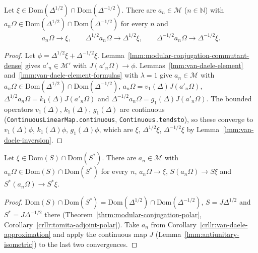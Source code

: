 \begin{corollary}
    \label{crllr:van-daele-approximation}
    \leanok
    Let $\xi \in \text{Dom}(\Delta^{1/2}) \cap \text{Dom}(\Delta^{-1/2})$. There are $a_n \in \mathcal{M}$ ($n \in \mathbb{N}$) with $a_n\Omega \in \text{Dom}(\Delta^{1/2}) \cap \text{Dom}(\Delta^{-1/2})$ for every $n$ and
    \begin{align}
        a_n\Omega \to \xi, \qquad \Delta^{1/2}a_n\Omega \to \Delta^{1/2}\xi, \qquad \Delta^{-1/2}a_n\Omega \to \Delta^{-1/2}\xi.
    \end{align}
\end{corollary}
\begin{proof}
    \leanok
    Let $\phi = \Delta^{1/2}\xi + \Delta^{-1/2}\xi$. Lemma~\ref{lmm:modular-conjugation-commutant-dense} gives $a'_n \in \mathcal{M}'$ with $J(a'_n\Omega) \to \phi$. Lemmas~\ref{lmm:van-daele-element} and~\ref{lmm:van-daele-element-formulas} with $\lambda = 1$ give $a_n \in \mathcal{M}$ with $a_n\Omega \in \text{Dom}(\Delta^{1/2}) \cap \text{Dom}(\Delta^{-1/2})$, $a_n\Omega = v_1(\Delta)J(a'_n\Omega)$, $\Delta^{1/2}a_n\Omega = k_1(\Delta)J(a'_n\Omega)$ and $\Delta^{-1/2}a_n\Omega = g_1(\Delta)J(a'_n\Omega)$. The bounded operators $v_1(\Delta)$, $k_1(\Delta)$, $g_1(\Delta)$ are continuous (\texttt{ContinuousLinearMap.continuous}, \texttt{Continuous.tendsto}), so these converge to $v_1(\Delta)\phi$, $k_1(\Delta)\phi$, $g_1(\Delta)\phi$, which are $\xi$, $\Delta^{1/2}\xi$, $\Delta^{-1/2}\xi$ by Lemma~\ref{lmm:van-daele-inversion}.
\end{proof}

\begin{corollary}
    \label{crllr:van-daele-approximation-tomita}
    \leanok
    Let $\xi \in \text{Dom}(S) \cap \text{Dom}(S^*)$. There are $a_n \in \mathcal{M}$ with $a_n\Omega \in \text{Dom}(S) \cap \text{Dom}(S^*)$ for every $n$, $a_n\Omega \to \xi$, $S(a_n\Omega) \to S\xi$ and $S^*(a_n\Omega) \to S^*\xi$.
\end{corollary}
\begin{proof}
    \leanok
    $\text{Dom}(S) \cap \text{Dom}(S^*) = \text{Dom}(\Delta^{1/2}) \cap \text{Dom}(\Delta^{-1/2})$, $S = J\Delta^{1/2}$ and $S^* = J\Delta^{-1/2}$ there (Theorem~\ref{thrm:modular-conjugation-polar}, Corollary~\ref{crllr:tomita-adjoint-polar}). Take $a_n$ from Corollary~\ref{crllr:van-daele-approximation} and apply the continuous map $J$ (Lemma~\ref{lmm:antiunitary-isometric}) to the last two convergences.
\end{proof}

